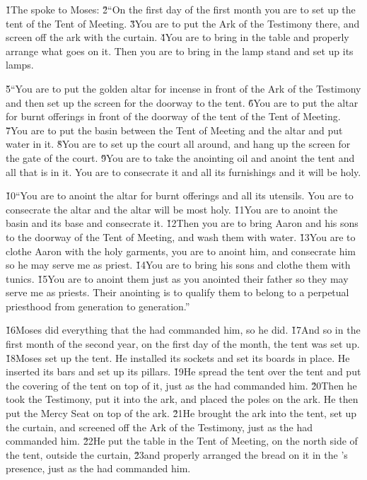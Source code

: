 \v{1}The  spoke to Moses: \v{2}``On the first day of the first month you are to set up the tent of the Tent of Meeting. \v{3}You are to put the Ark of the Testimony there, and screen off the ark with the curtain. \v{4}You are to bring in the table and properly arrange what goes on it. Then you are to bring in the lamp stand and set up its lamps.

\v{5}``You are to put the golden altar for incense in front of the Ark of the Testimony and then set up the screen for the doorway to the tent. \v{6}You are to put the altar for burnt offerings in front of the doorway of the tent of the Tent of Meeting. \v{7}You are to put the basin between the Tent of Meeting and the altar and put water in it. \v{8}You are to set up the court all around, and hang up the screen for the gate of the court. \v{9}You are to take the anointing oil and anoint the tent and all that is in it. You are to consecrate it and all its furnishings and it will be holy.

\v{10}``You are to anoint the altar for burnt offerings and all its utensils. You are to consecrate the altar and the altar will be most holy. \v{11}You are to anoint the basin and its base and consecrate it. \v{12}Then you are to bring Aaron and his sons to the doorway of the Tent of Meeting, and wash them with water. \v{13}You are to clothe Aaron with the holy garments, you are to anoint him, and consecrate him so he may serve me as priest. \v{14}You are to bring his sons and clothe them with tunics. \v{15}You are to anoint them just as you anointed their father so they may serve me as priests. Their anointing is to qualify them to belong to a perpetual priesthood from generation to generation.''

\v{16}Moses did everything that the  had commanded him, so he did. \v{17}And so in the first month of the second year, on the first day of the month, the tent was set up. \v{18}Moses set up the tent. He installed its sockets and set its boards in place. He inserted its bars and set up its pillars. \v{19}He spread the tent over the tent and put the covering of the tent on top of it, just as the  had commanded him. \v{20}Then he took the Testimony, put it into the ark, and placed the poles on the ark. He then put the Mercy Seat on top of the ark. \v{21}He brought the ark into the tent, set up the curtain, and screened off the Ark of the Testimony, just as the  had commanded him. \v{22}He put the table in the Tent of Meeting, on the north side of the tent, outside the curtain, \v{23}and properly arranged the bread on it in the 's presence, just as the  had commanded him.

